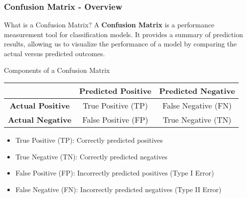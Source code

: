 \documentclass[aspectratio=169]{beamer}
\begin{document}
\begin{frame}[fragile]
  \frametitle{Confusion Matrix - Overview}
  
  \begin{block}{What is a Confusion Matrix?}
    A \textbf{Confusion Matrix} is a performance measurement tool for classification models. 
    It provides a summary of prediction results, allowing us to visualize the performance of a model by comparing the actual versus predicted outcomes.
  \end{block}
  
  \begin{block}{Components of a Confusion Matrix}
    \begin{center}
    \begin{tabular}{|c|c|c|}
      \hline
      & \textbf{Predicted Positive} & \textbf{Predicted Negative} \\
      \hline
      \textbf{Actual Positive} & True Positive (TP) & False Negative (FN) \\
      \hline
      \textbf{Actual Negative} & False Positive (FP) & True Negative (TN) \\
      \hline
    \end{tabular}
    \end{center}
    \begin{itemize}
      \item True Positive (TP): Correctly predicted positives
      \item True Negative (TN): Correctly predicted negatives
      \item False Positive (FP): Incorrectly predicted positives (Type I Error)
      \item False Negative (FN): Incorrectly predicted negatives (Type II Error)
    \end{itemize}
  \end{block}
\end{frame}
\end{document}
